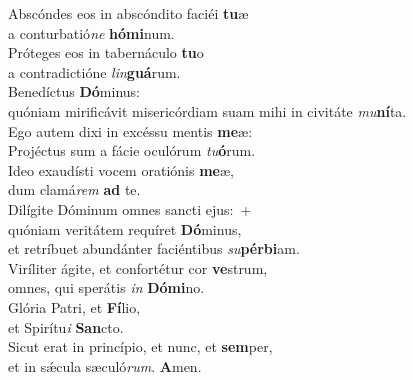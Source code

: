 \oddverse Abscóndes eos in abscóndito faciéi \textbf{tu}æ~\*\\
\oddverse a conturbatió\textit{ne} \textbf{hó}\textbf{mi}num.\\
\evenverse Próteges eos in tabernáculo \textbf{tu}o~\*\\
\evenverse a contradictióne \textit{lin}\textbf{guá}rum.\\
\oddverse Benedíctus \textbf{Dó}minus:~\*\\
\oddverse quóniam mirificávit misericórdiam suam mihi in civitáte \textit{mu}\textbf{ní}ta.\\
\evenverse Ego autem dixi in excéssu mentis \textbf{me}æ:~\*\\
\evenverse Projéctus sum a fácie oculórum \textit{tu}\textbf{ó}rum.\\
\oddverse Ideo exaudísti vocem oratiónis \textbf{me}æ,~\*\\
\oddverse dum clamá\textit{rem} \textbf{ad} te.\\
\evenverse Dilígite Dóminum omnes sancti ejus:~+\\
\evenverse  quóniam veritátem requíret \textbf{Dó}minus,~\*\\
\evenverse et retríbuet abundánter faciéntibus \textit{su}\textbf{pér}\textbf{bi}am.\\
\oddverse Viríliter ágite, et confortétur cor \textbf{ve}strum,~\*\\
\oddverse omnes, qui sperátis \textit{in} \textbf{Dó}\textbf{mi}no.\\
\evenverse Glória Patri, et \textbf{Fí}lio,~\*\\
\evenverse et Spirítu\textit{i} \textbf{San}cto.\\
\oddverse Sicut erat in princípio, et nunc, et \textbf{sem}per,~\*\\
\oddverse et in sǽcula sæculó\textit{rum}. \textbf{A}men.\\
